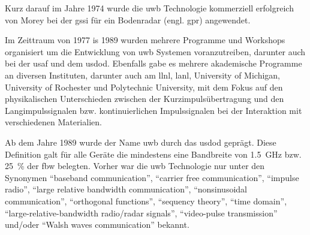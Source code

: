 

Kurz darauf im Jahre 1974 wurde die \gls{uwb} Technologie kommerziell erfolgreich von Morey bei der \gls{gssi} für ein Bodenradar (engl. \acrfull{gpr}) angewendet. \cite{barrett2001technical}

Im Zeittraum von 1977 is 1989 wurden mehrere Programme und Workshops organisiert um die Entwicklung von \gls{uwb} Systemen voranzutreiben, darunter auch bei der \gls{usaf} und dem \gls{usdod}. Ebenfalls gabe es mehrere akademische Programme an diversen Instituten, darunter auch am \gls{llnl}, \gls{lanl}, University of Michigan, University of Rochester und
Polytechnic University, mit dem Fokus auf den physikalischen Unterschieden zwischen der Kurzimpulsübertragung und den Langimpulssignalen bzw. kontinuierlichen Impulssignalen bei der Interaktion mit verschiedenen Materialien.\cite{barrett2001technical}


Ab dem Jahre 1989 wurde der Name \gls{uwb} durch das \gls{usdod} geprägt. Diese Definition galt für alle Geräte die mindestens eine Bandbreite von \SI{1.5}{\GHz} bzw. \SI{25}{\percent} der \gls{fbw} belegten. Vorher war die \gls{uwb} Technologie nur unter den Synonymen ``baseband communication'', ``carrier free communication'', ``impulse radio'', ``large relative bandwidth communication'', ``nonsinusoidal communication'', ``orthogonal functions'', ``sequency theory'', ``time domain'', ``large-relative-bandwidth radio/radar signals'', ``video-pulse transmission'' und/oder ``Walsh waves communication'' bekannt. \cite{eltaher2004positioning, fowler1990assessment, yang2004uwbcom, aiello2006ultra, fontana2004recent}

